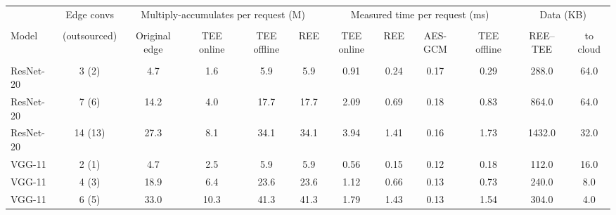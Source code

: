 \footnotesize
\setlength{\tabcolsep}{3.5pt}
\begin{tabular}{@{}lccccccccccc@{}}
\toprule
& Edge convs & \multicolumn{4}{c}{Multiply-accumulates per request (M)} & \multicolumn{4}{c}{Measured time per request (ms)} & \multicolumn{2}{c}{Data (KB)} \\\\
\cmidrule(lr){3-6}\cmidrule(lr){7-10}\cmidrule(lr){11-12}
Model & (outsourced) & Original edge & TEE online & TEE offline & REE & TEE online & REE & AES-GCM & TEE offline & REE--TEE & to cloud \\\\
\midrule
ResNet-20 & 3 (2) & 4.7 & 1.6 & 5.9 & 5.9 & 0.91 & 0.24 & 0.17 & 0.29 & 288.0 & 64.0 \\
ResNet-20 & 7 (6) & 14.2 & 4.0 & 17.7 & 17.7 & 2.09 & 0.69 & 0.18 & 0.83 & 864.0 & 64.0 \\
ResNet-20 & 14 (13) & 27.3 & 8.1 & 34.1 & 34.1 & 3.94 & 1.41 & 0.16 & 1.73 & 1432.0 & 32.0 \\
VGG-11 & 2 (1) & 4.7 & 2.5 & 5.9 & 5.9 & 0.56 & 0.15 & 0.12 & 0.18 & 112.0 & 16.0 \\
VGG-11 & 4 (3) & 18.9 & 6.4 & 23.6 & 23.6 & 1.12 & 0.66 & 0.13 & 0.73 & 240.0 & 8.0 \\
VGG-11 & 6 (5) & 33.0 & 10.3 & 41.3 & 41.3 & 1.79 & 1.43 & 0.13 & 1.54 & 304.0 & 4.0 \\
\bottomrule
\end{tabular}